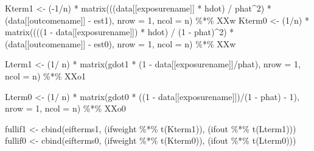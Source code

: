 \documentclass[
  letterpaper,
  DIV=11,
  numbers=noendperiod]{scrartcl}
\newenvironment{Shaded}{\begin{snugshade}}{\end{snugshade}}
\newcommand{\AttributeTok}[1]{\textcolor[rgb]{0.40,0.45,0.13}{#1}}
\newcommand{\DecValTok}[1]{\textcolor[rgb]{0.68,0.00,0.00}{#1}}
\newcommand{\FunctionTok}[1]{\textcolor[rgb]{0.28,0.35,0.67}{#1}}
\newcommand{\NormalTok}[1]{\textcolor[rgb]{0.00,0.23,0.31}{#1}}
\newcommand{\OtherTok}[1]{\textcolor[rgb]{0.00,0.23,0.31}{#1}}
\newcommand{\SpecialCharTok}[1]{\textcolor[rgb]{0.37,0.37,0.37}{#1}}
\begin{document}
\begin{Shaded}
\begin{Highlighting}[]
\NormalTok{  Kterm1 }\OtherTok{\textless{}{-}}\NormalTok{ (}\SpecialCharTok{{-}}\DecValTok{1}\SpecialCharTok{/}\NormalTok{n) }\SpecialCharTok{*} \FunctionTok{matrix}\NormalTok{(((data[[exposurename]] }\SpecialCharTok{*}\NormalTok{ hdot) }\SpecialCharTok{/}\NormalTok{ phat}\SpecialCharTok{\^{}}\DecValTok{2}\NormalTok{) }\SpecialCharTok{*} 
\NormalTok{                              (data[[outcomename]] }\SpecialCharTok{{-}}\NormalTok{ est1), }\AttributeTok{nrow =} \DecValTok{1}\NormalTok{, }\AttributeTok{ncol =}\NormalTok{ n) }\SpecialCharTok{\%*\%}
\NormalTok{    XXw}
\NormalTok{  Kterm0 }\OtherTok{\textless{}{-}}\NormalTok{ (}\DecValTok{1}\SpecialCharTok{/}\NormalTok{n) }\SpecialCharTok{*} \FunctionTok{matrix}\NormalTok{((((}\DecValTok{1} \SpecialCharTok{{-}}\NormalTok{ data[[exposurename]]) }\SpecialCharTok{*}\NormalTok{ hdot) }\SpecialCharTok{/}\NormalTok{ (}\DecValTok{1} \SpecialCharTok{{-}}\NormalTok{ phat)}\SpecialCharTok{\^{}}\DecValTok{2}\NormalTok{) }\SpecialCharTok{*} 
\NormalTok{                             (data[[outcomename]] }\SpecialCharTok{{-}}\NormalTok{ est0), }\AttributeTok{nrow =} \DecValTok{1}\NormalTok{, }\AttributeTok{ncol =}\NormalTok{ n) }\SpecialCharTok{\%*\%}
\NormalTok{    XXw}
  
\NormalTok{  Lterm1 }\OtherTok{\textless{}{-}}\NormalTok{ (}\DecValTok{1}\SpecialCharTok{/}\NormalTok{ n) }\SpecialCharTok{*} \FunctionTok{matrix}\NormalTok{(gdot1 }\SpecialCharTok{*}\NormalTok{ (}\DecValTok{1} \SpecialCharTok{{-}}\NormalTok{ data[[exposurename]]}\SpecialCharTok{/}\NormalTok{phat), }\AttributeTok{nrow =} \DecValTok{1}\NormalTok{, }\AttributeTok{ncol =}\NormalTok{ n) }\SpecialCharTok{\%*\%} 
\NormalTok{    XXo1}
  
\NormalTok{  Lterm0 }\OtherTok{\textless{}{-}}\NormalTok{ (}\DecValTok{1}\SpecialCharTok{/}\NormalTok{ n) }\SpecialCharTok{*} \FunctionTok{matrix}\NormalTok{(gdot0 }\SpecialCharTok{*}\NormalTok{ ((}\DecValTok{1} \SpecialCharTok{{-}}\NormalTok{ data[[exposurename]])}\SpecialCharTok{/}\NormalTok{(}\DecValTok{1} \SpecialCharTok{{-}}\NormalTok{ phat) }\SpecialCharTok{{-}} \DecValTok{1}\NormalTok{), }\AttributeTok{nrow =} \DecValTok{1}\NormalTok{, }\AttributeTok{ncol =}\NormalTok{ n) }\SpecialCharTok{\%*\%} 
\NormalTok{    XXo0}
  
\NormalTok{  fullif1 }\OtherTok{\textless{}{-}} \FunctionTok{cbind}\NormalTok{(eifterms1, (ifweight }\SpecialCharTok{\%*\%} \FunctionTok{t}\NormalTok{(Kterm1)), (ifout }\SpecialCharTok{\%*\%} \FunctionTok{t}\NormalTok{(Lterm1)))}
\NormalTok{  fullif0 }\OtherTok{\textless{}{-}} \FunctionTok{cbind}\NormalTok{(eifterms0, (ifweight }\SpecialCharTok{\%*\%} \FunctionTok{t}\NormalTok{(Kterm0)), (ifout }\SpecialCharTok{\%*\%} \FunctionTok{t}\NormalTok{(Lterm0)))}
  

\end{Highlighting}
\end{Shaded}
\end{document}
